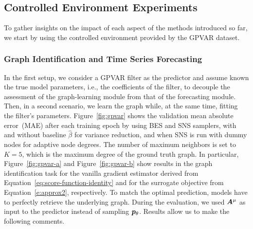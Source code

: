 \subsection{Controlled Environment Experiments}\label{sec:gpvar}

To gather insights on the impact of each aspect of the methods introduced so far, we start by using the controlled environment provided by the GPVAR dataset. 

\subsubsection{Graph Identification and Time Series Forecasting}\label{sec:gpvar-exp}

In the first setup, we consider a GPVAR filter as the predictor and assume known the true model parameters, i.e., the coefficients of the filter, to decouple the assessment of the graph-learning module from that of the forecasting module.
Then, in a second scenario, we learn the graph while, at the same time, fitting the filter's parameters. Figure~\ref{fig:gpvar} shows the validation mean absolute error~(MAE) after each training epoch by using BES and SNS samplers, with and without baseline $\hat\beta$ for variance reduction, and when SNS is run with dummy nodes for adaptive node degrees. The number of maximum neighbors is set to $K=5$, which is the maximum degree of the ground truth graph.
In particular, Figure~\ref{fig:gpvar-a} and Figure~\ref{fig:gpvar-b} show results in the graph identification task for the vanilla gradient estimator derived from Equation~\eqref{eq:score-function-identity} and for the surrogate objective from Equation~\eqref{e:approx2}, respectively. To match the optimal prediction, models have to perfectly retrieve the underlying graph. During the evaluation, we used ${\bm{A}}^\mu$ as input to the predictor instead of sampling ${{\bm{p}}_\theta}$. Results allow us to make the following comments.

